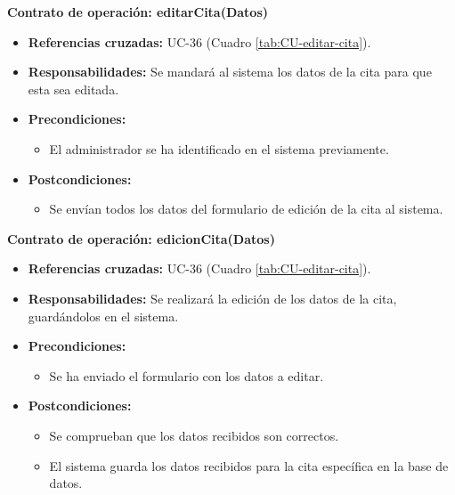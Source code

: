 \textbf{Contrato de operación: editarCita(Datos)}
\begin{itemize}
\item \textbf{Referencias cruzadas:} UC-36 (Cuadro \ref{tab:CU-editar-cita}).
\item \textbf{Responsabilidades:} Se mandará al sistema los datos de la cita para que esta sea editada.
\item \textbf{Precondiciones:} 
 \begin{itemize}
\item El administrador se ha identificado en el sistema previamente.
\end {itemize}
\item \textbf{Postcondiciones:} 
 \begin{itemize}
\item Se envían todos los datos del formulario de edición de la cita al sistema.
\end {itemize}
\end {itemize}

\textbf{Contrato de operación: edicionCita(Datos)}
\begin{itemize}
\item \textbf{Referencias cruzadas:} UC-36 (Cuadro \ref{tab:CU-editar-cita}).
\item \textbf{Responsabilidades:} Se realizará la edición de los datos de la cita, guardándolos en el sistema.
\item \textbf{Precondiciones:} 
 \begin{itemize}
\item Se ha enviado el formulario con los datos a editar.
\end {itemize}
\item \textbf{Postcondiciones:} 
 \begin{itemize}
 \item Se comprueban que los datos recibidos son correctos.
\item El sistema guarda los datos recibidos para la cita específica en la base de datos.
\end {itemize}
\end {itemize}

